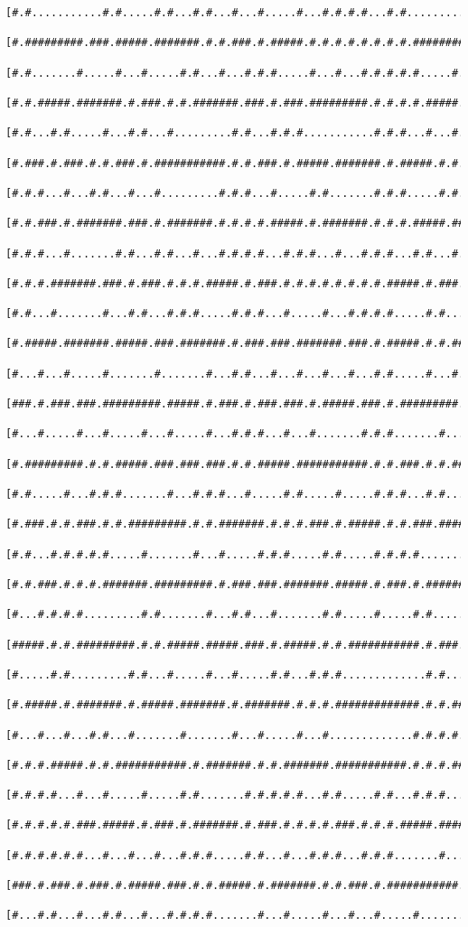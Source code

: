 \documentclass[a4paper,10pt,ngerman]{scrartcl}
\begin{document}
\begin{lstlisting}[frame=tb]
 [#.#...........#.#.....#.#...#.#...#...#.....#...#.#.#.#...#.#...................#]
 [#.#########.###.#####.#######.#.#.###.#.#####.#.#.#.#.#.#.#.#.#################.#]
 [#.#.......#.....#...#.....#.#...#...#.#.#.....#...#...#.#.#.#.#.....#.........#.#]
 [#.#.#####.#######.#.###.#.#.#######.###.#.###.#########.#.#.#.#.#####.#######.#.#]
 [#.#...#.#.....#...#.#...#.........#.#...#.#.#...........#.#.#...#...#.......#...#]
 [#.###.#.###.#.#.###.#.###########.#.#.###.#.#####.#######.#.#####.#.#.#####.###.#]
 [#.#.#...#...#.#...#...#.........#.#.#...#.....#.#.......#.#.#.....#.#.#.....#.#.#]
 [#.#.###.#.#######.###.#.#######.#.#.#.#.#####.#.#######.#.#.#.#####.###.#####.#.#]
 [#.#.#...#.......#.#...#.#...#...#.#.#.#...#.#.#...#...#.#.#...#.#...#...#...#...#]
 [#.#.#.#######.###.#.###.#.#.#.#####.#.###.#.#.#.#.#.#.#.#.#####.#.###.###.#.#.###]
 [#.#...#.......#...#.#...#.#.#.....#.#.#...#.....#...#.#.#.#.....#.#...#...#.#.#.#]
 [#.#####.#######.#####.###.#######.#.###.###.#######.###.#.#####.#.#.#####.###.#.#]
 [#...#...#.....#.......#.......#...#.#...#...#...#...#...#.#.....#...#.....#...#.#]
 [###.#.###.###.#########.#####.#.###.#.###.###.#.#####.###.#.#########.#.###.###.#]
 [#...#.....#...#.....#...#.....#...#.#.#...#...#.......#.#.#.......#...#...#...#.#]
 [#.#########.#.#.#####.###.###.###.#.#.#####.###########.#.#.###.#.#.#####.###.#.#]
 [#.#.....#...#.#.#.......#...#.#.#...#.....#.#.....#.....#.#.#...#.#.....#...#...#]
 [#.###.#.#.###.#.#.#########.#.#.#######.#.#.#.###.#.#####.#.#.###.#######.#####.#]
 [#.#...#.#.#.#.#.....#.......#...#.....#.#.#.....#.#.....#.#.#.#...........#.....#]
 [#.#.###.#.#.#.#######.#########.#.###.###.#######.#####.#.###.#.#######.###.#####]
 [#...#.#.#.#.........#.#.......#...#.#...#.......#.#.....#.....#.#.....#.#...#...#]
 [#####.#.#.#########.#.#.#####.#####.###.#.#####.#.#.###########.#.###.#.#.###.###]
 [#.....#.#.........#.#...#.....#...#.....#.#...#.#.#.............#.#...#.#.#.....#]
 [#.#####.#.#######.#.#####.#######.#.#######.#.#.#.#############.#.#.###.#.#####.#]
 [#...#...#...#.#...#.......#.......#...#.....#...#.............#.#.#.#...#.....#.#]
 [#.#.#.#####.#.#.###########.#.#######.#.#.#######.###########.#.#.#.#########.#.#]
 [#.#.#.#...#...#.....#.....#.#.......#.#.#.#.#...#.#.....#.#...#.#.#.........#...#]
 [#.#.#.#.#.###.#####.#.###.#.#######.#.###.#.#.#.#.###.#.#.#.#####.#########.###.#]
 [#.#.#.#.#.#...#...#...#...#.#.#.....#.#...#...#.#.#...#.#.#.......#...#.......#.#]
 [###.#.###.#.###.#.#####.###.#.#.#####.#.#######.#.#.###.#.###########.#.#.#####.#]
 [#...#.#...#...#.#...#...#.#.#.#.......#...#.....#...#...#.....#.......#.#.#.....#]

\end{lstlisting}
\end{document}
